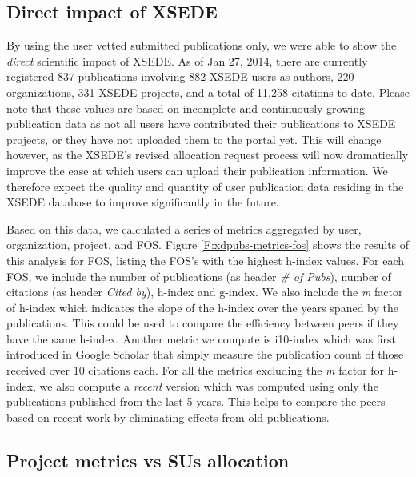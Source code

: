 \documentclass{tex/sig-alternate}
\begin{document}
\subsection{Direct impact of XSEDE} 
 
By using the user vetted submitted publications only, we were able to show the \emph{direct} scientific impact of XSEDE.  As of Jan 27, 2014, there are currently registered 837 publications involving 882 XSEDE users as authors, 220 organizations, 331 XSEDE projects, and a total of 11,258 citations to date. Please note that these values are based on incomplete and continuously growing publication data as not all users have contributed their publications to XSEDE projects, or they have not uploaded them to the portal yet. This will change however, as the XSEDE's revised allocation request process will now dramatically improve the ease at which users can upload their publication information. We therefore expect the quality and quantity of user publication data residing in the XSEDE database to improve significantly in the future. 

Based on this data, we calculated a series of metrics aggregated by user, organization, project, and FOS.  Figure \ref{F:xdpubs-metrics-fos} shows the results of this analysis for FOS, listing the FOS's with the highest h-index values. For each FOS, we include the number of publications (as header \emph{\# of Pubs}), number of citations (as header \emph{Cited by}), h-index and g-index. We also include the \emph{m} factor of h-index which indicates the slope of the h-index over the years spaned by the publications. This could be used to compare the efficiency between peers if they have the same h-index. Another metric we compute is i10-index \cite{www-i10index} which was first introduced in Google Scholar that simply measure the publication count of those received over 10 citations each. For all the metrics excluding the \emph{m} factor for h-index, we also compute a \emph{recent} version which was computed using only the publications published from the last 5 years. This helps to compare the peers based on recent work by eliminating effects from old publications.

 
\subsection{Project metrics vs SUs allocation} 
 
\end{document}
